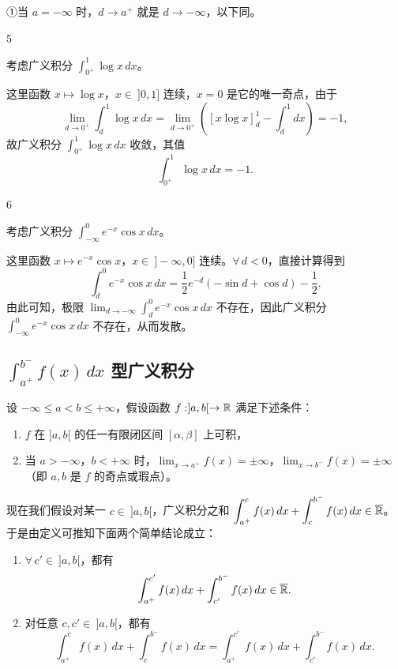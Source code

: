 ①当 $a=-\infty$ 时，$d\to a^+$ 就是 $d\to-\infty$，以下同。

\begin{sourceexample}{5}

考虑广义积分 $\displaystyle\int_{0^+}^1\log x\,dx$。

\end{sourceexample}

这里函数 $x\longmapsto\log x$，$x\in\ ]0,1]$ 连续，$x=0$ 是它的唯一奇点，由于
\[\lim_{d\to0^+}\int_d^1\log x\,dx=\lim_{d\to0^+}\left([x\log x]_d^1-\int_d^1dx\right)=-1,\]
故广义积分 $\displaystyle\int_{0^+}^1\log x\,dx$ 收敛，其值
\[\int_{0^+}^1\log x\,dx=-1.\]

\begin{sourceexample}{6}

考虑广义积分 $\displaystyle\int_{-\infty}^0e^{-x}\cos x\,dx$。

\end{sourceexample}

这里函数 $x\longmapsto e^{-x}\cos x$，$x\in\ ]-\infty,0]$ 连续。$\forall\,d<0$，直接计算得到
\[\int_d^0e^{-x}\cos x\,dx=\frac{1}{2}e^{-d}(-\sin d+\cos d)-\frac{1}{2}.\]
由此可知，极限 $\displaystyle\lim_{d\to-\infty}\int_d^0e^{-x}\cos x\,dx$ 不存在，因此广义积分 $\displaystyle\int_{-\infty}^0e^{-x}\cos x\,dx$ 不存在，从而发散。

\subsection{\texorpdfstring{\(\int_{a^+}^{b^-}f(x)\,dx\) 型广义积分}{a+ 到 b- 型广义积分}}

设 $-\infty\leqslant a<b\leqslant+\infty$，假设函数 $f:]a,b[\to\mathbb{R}$ 满足下述条件：

\begin{enumerate}[label=\arabic{enumi})]
\item $f$ 在 $]a,b[$ 的任一有限闭区间 $[\alpha,\beta]$ 上可积，
\item 当 $a>-\infty$，$b<+\infty$ 时，$\displaystyle\lim_{x\to a^+}f(x)=\pm\infty$，$\displaystyle\lim_{x\to b^-}f(x)=\pm\infty$（即 $a,b$ 是 $f$ 的奇点或瑕点）。
\end{enumerate}

现在我们假设对某一 $c\in\ ]a,b[$，广义积分之和 $\displaystyle\int_{a^+}^cf(x)\,dx+\int_c^{b^-}f(x)\,dx\in\overline{\mathbb{R}}$。于是由定义可推知下面两个简单结论成立：

\begin{enumerate}[label=\arabic{enumi})]
\item $\forall\,c'\in\ ]a,b[$，都有
\[\int_{a^+}^{c'}f(x)\,dx+\int_{c'}^{b^-}f(x)\,dx\in\overline{\mathbb{R}}.\]
\item 对任意 $c,c'\in\ ]a,b[$，都有
\[\int_{a^+}^{c}f(x)\,dx+\int_{c}^{b^-}f(x)\,dx=\int_{a^+}^{c'}f(x)\,dx+\int_{c'}^{b^-}f(x)\,dx.\]
\end{enumerate}

